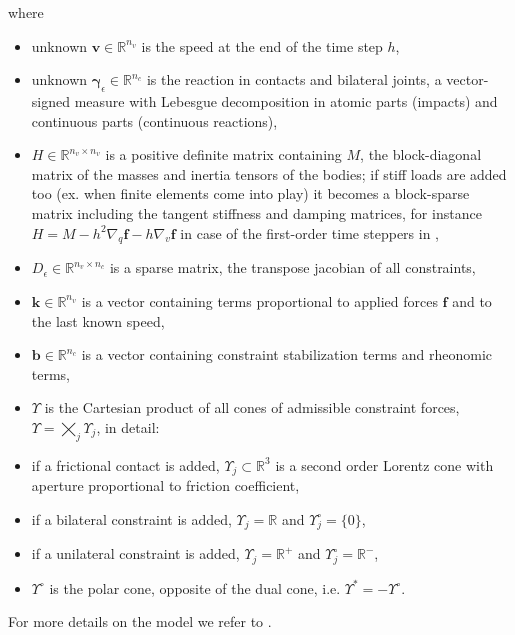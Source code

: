 \documentclass[AMA,STIX1COL]{WileyNJD-v2}
\newcommand{\vect}[1]{\bm{#1}}
\begin{document}
where 
\begin{itemize}
		\item unknown $\vect{v} \in \mathbb{R}^{n_v}$ is the speed at the end of the time step $h$,
		\item unknown $\vect{\gamma}_\epsilon \in \mathbb{R}^{n_c}$ is the reaction in contacts and bilateral joints, a vector-signed measure with Lebesgue decomposition in atomic parts (impacts) and continuous parts (continuous reactions),
    \item $H \in \mathbb{R}^{n_v \times n_v}$ is a positive definite matrix containing $M$, 
		the block-diagonal matrix of the masses and inertia tensors of the bodies; if stiff
		loads are added too (ex. when finite elements come into play) it becomes a block-sparse matrix including the tangent stiffness and damping matrices,
		for instance $H=M-{h^2}\nabla_q\vect{f}-{h}\nabla_v\vect{f}$ in case of the first-order time steppers in \cite{TasoraAnitescuCMAME10,Francu2017},
    \item $D_\epsilon \in \mathbb{R}^{n_v \times n_c}$ is a sparse matrix, the transpose jacobian of all constraints,
    \item $\vect{k} \in \mathbb{R}^{n_v}$ is a vector containing terms proportional to applied forces $\vect{f}$ and to the last known speed,
    \item $\vect{b} \in \mathbb{R}^{n_c}$ is a vector containing constraint stabilization terms and rheonomic terms,
    \item $\Upsilon$ is the Cartesian product of all cones of admissible constraint forces, $\Upsilon = \bigtimes_j \Upsilon_j$, in detail:
    \item if a frictional contact is added, $\Upsilon_j \subset \mathbb{R}^3$ is a second order Lorentz cone with aperture proportional to friction coefficient,
    \item if a bilateral constraint is added, $\Upsilon_j = \mathbb{R}$ and $\Upsilon^\circ_j = \{0\}$,
    \item if a unilateral constraint is added, $\Upsilon_j = \mathbb{R}^+$ and $\Upsilon^\circ_j = \mathbb{R}^-$,
    \item $\Upsilon^{\circ}$ is the polar cone, opposite of the dual cone, i.e. $\Upsilon^{*} = -\Upsilon^\circ$.
\end{itemize}

For more details on the model we refer to 
\cite{negrutSerbanTasoraJCND2017}. %
\end{document}
